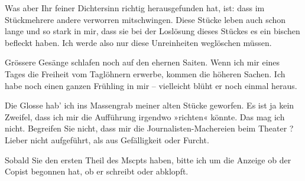 \pstart
           Was aber Ihr feiner Dichtersinn richtig
         herausgefunden hat, ist: dass im Stückmehrere andere verworren mitschwingen.
      Diese Stücke leben auch schon lange
      und so stark in mir, dass sie bei
      der Loslösung dieses Stückes es ein
      bischen befleckt haben. Ich werde
      also nur diese Unreinheiten weglöschen
      müssen. \strikeout{\textcolor{gray}{×}\-\textcolor{gray}{×}\-\textcolor{gray}{×}\-\textcolor{gray}{×}\-\textcolor{gray}{×}{ }\textcolor{gray}{×}\-\textcolor{gray}{×}\-\textcolor{gray}{×}\-\textcolor{gray}{×}\-\textcolor{gray}{×}\-\textcolor{gray}{×}{ }\textcolor{gray}{×}\-\textcolor{gray}{×}\-\textcolor{gray}{×}\-\textcolor{gray}{×}\-\textcolor{gray}{×}{ }\textcolor{gray}{×}\-\textcolor{gray}{×}\-\textcolor{gray}{×}}\pend
           
\pstart
           Grössere Gesänge schlafen noch auf
      den ehernen Saiten. Wenn ich mir
      eines Tages die Freiheit vom Taglöhnern
      erwerbe, kommen die höheren Sachen.
      Ich habe noch einen ganzen Frühling
      in mir – vielleicht blüht er noch
      einmal heraus.\pend
           
\pstart
           Die Glosse hab’ ich ins Massengrab
      meiner alten Stücke geworfen.
      Es ist ja kein Zweifel, dass ich
      mir die Aufführung irgendwo
      »richten« könnte. Das mag ich
      nicht. Begreifen Sie nicht, dass
      mir die Journalisten-Machereien
      beim Theater \label{K_L03839-3v}\label{K_L03839-3}? Lieber
      nicht aufgeführt, als aus Gefälligkeit
      oder Furcht.\pend
           
\pstart
           Sobald Sie den ersten Theil des
         Mscpts haben, bitte ich um die Anzeige
      ob der Copist begonnen hat, ob er
      schreibt oder abklopft.\pend
           
